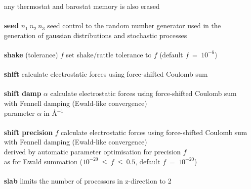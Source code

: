 \begin{tabbing}
\>                                              \> any thermostat and barostat memory is also erased \\
\>                                              \> \\
\> {\bf seed} $n_{1}~n_{2}~n_{3}$               \> seed control to the random number generator used in the \\
\>                                              \> generation of gaussian distributions and stochastic processes \\
\>                                              \> \\
\> {\bf shake} (tolerance) $f$                  \> set shake/rattle tolerance to $f$ (default $f~=~10^{-6}$) \\
\>                                              \> \\
\> {\bf shift}                                  \> calculate electrostatic forces using force-shifted Coulomb sum \\
\>                                              \> \\
\> {\bf shift damp} $\alpha$                    \> calculate electrostatic forces using force-shifted Coulomb sum \\
\>                                              \> with Fennell \cite{fennell-06a} damping (Ewald-like convergence) \\
\>                                              \> parameter $\alpha$ in \AA$^{-1}$ \\
\>                                              \> \\
\> {\bf shift precision} $f$                    \> calculate electrostatic forces using force-shifted Coulomb sum \\
\>                                              \> with Fennell \cite{fennell-06a} damping (Ewald-like convergence) \\
\>                                              \> derived by automatic parameter optimisation for precision $f$ \\
\>                                              \> as for Ewald summation ($10^{-20}~\le~f~\le~0.5$, default $f~=~10^{-20}$) \\
\>                                              \> \\
\> {\bf slab}                                   \> limits the number of processors in z-direction to 2 \\

\end{tabbing}
